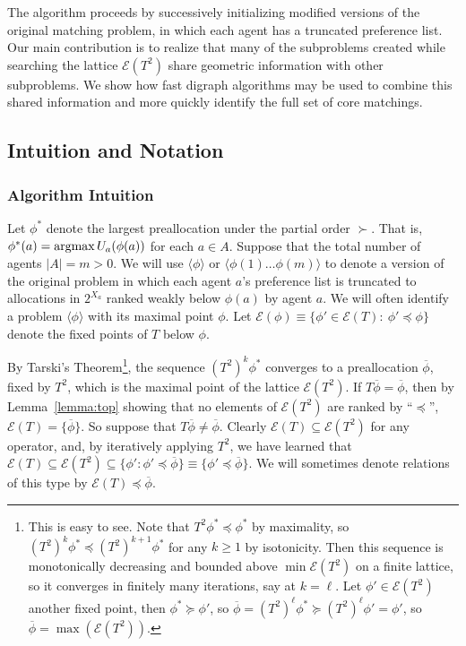 \documentclass[11pt,reqno]{amsart}
\theoremstyle{definition}
\numberwithin{equation}{section}
\newcommand{\ol}{\overline}
\newcommand{\argmax}{\operatornamewithlimits{argmax}}
\newcommand{\lag}{\langle}
\newcommand{\rag}{\rangle}
\newcommand{\pre}{\phi}
\newcommand{\sub}{\subseteq}
\newcommand{\fix}{\mathcal{E}}
\newcommand{\suq}{\succeq}
\newcommand{\peq}{\preceq}
\newcommand{\su}{\succ}
\newcommand{\toppre}{\ol{\pre}}
\begin{document}
The algorithm proceeds by successively initializing modified versions of the original matching problem, in which each agent has a truncated preference list.
Our main contribution is to realize that many of the subproblems created while searching the lattice $\fix(T^2)$ share geometric information with other subproblems.
We show how fast digraph algorithms may be used to combine this shared information and more quickly identify the full set of core matchings. 

\subsection{Intuition and Notation} \label{section:description1}
\subsubsection{Algorithm Intuition}
Let $\pre^*$ denote the largest preallocation under the partial order $\su$.
That is, $\pre^*(a) = \argmax U_a(\pre(a))$ for each $a \in A$.
Suppose that the total number of agents $|A| = m > 0$.
We will use $\langle \pre \rangle$ or $\langle \pre(1) \hdots \pre(m) \rangle$  to denote a version of the original problem in which each agent $a$'s preference list is truncated to allocations in $2^{X_a}$ ranked weakly below $\pre(a)$ by agent $a$. 
We will often identify a problem $\lag \pre \rag$ with its maximal point $\pre$.
Let $\fix(\pre) \equiv \{\pre' \in \fix(T): \: \pre' \peq \pre\}$ denote the fixed points of $T$ below $\pre$.  

By Tarski's Theorem\footnote{This is easy to see.
Note that $T^2 \pre^* \peq \pre^*$ by maximality, so $(T^2)^k \pre^* \peq (T^2)^{k+1} \pre^*$ for any $k\geq 1$ by isotonicity.
Then this sequence is monotonically decreasing and bounded above $\min \fix(T^2)$ on a finite lattice, so it converges in finitely many iterations, say at $k = \ell$.
Let $\pre' \in \fix(T^2)$ another fixed point, then $\pre^* \suq \pre'$, so $\toppre = (T^2)^{\ell} \pre^* \suq (T^2)^{\ell} \pre' = \pre'$, so $\toppre = \max(\fix(T^2))$.}, the sequence $(T^2)^k \pre^*$ converges to a preallocation $\toppre$, fixed by $T^2$, which is the maximal point of the lattice $\fix(T^2)$.
If $T \toppre = \toppre$, then by Lemma~\ref{lemma:top} showing that no elements of $\fix(T^2)$ are ranked by ``$\peq$'', $\fix(T) = \{\toppre\}$.
So suppose that $T \toppre \not = \toppre$. 
Clearly $\fix(T) \sub \fix(T^2)$ for any operator, and, by iteratively applying $T^2$, we have learned that $\fix(T) \sub \fix (T^2) \sub \{\pre': \pre' \peq \toppre\} \equiv \{\pre' \peq \toppre\}$.
We will sometimes denote relations of this type by $\fix(T) \peq \toppre$. 
\end{document}
